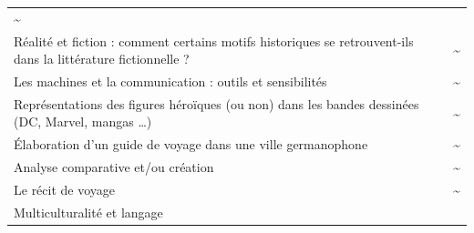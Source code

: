 \documentclass[
  10pt,
  french,
  a5paper,
  openany]{book}
\begin{document}
\begin{longtable}[]{@{}lc@{}}
\begin{minipage}[t]{0.06\columnwidth}
\textasciitilde{}\strut
\end{minipage}\tabularnewline
\begin{minipage}[t]{0.88\columnwidth}\raggedright
Réalité et fiction : comment certains motifs historiques se retrouvent-ils dans la littérature fictionnelle ?\strut
\end{minipage} & \begin{minipage}[t]{0.06\columnwidth}\centering
\textasciitilde{}\strut
\end{minipage}\tabularnewline
\begin{minipage}[t]{0.88\columnwidth}\raggedright
Les machines et la communication : outils et sensibilités\strut
\end{minipage} & \begin{minipage}[t]{0.06\columnwidth}\centering
\textasciitilde{}\strut
\end{minipage}\tabularnewline
\begin{minipage}[t]{0.88\columnwidth}\raggedright
Représentations des figures héroïques (ou non) dans les bandes dessinées (DC, Marvel, mangas \ldots)\strut
\end{minipage} & \begin{minipage}[t]{0.06\columnwidth}\centering
\textasciitilde{}\strut
\end{minipage}\tabularnewline
\begin{minipage}[t]{0.88\columnwidth}\raggedright
Élaboration d'un guide de voyage dans une ville germanophone\strut
\end{minipage} & \begin{minipage}[t]{0.06\columnwidth}\centering
\textasciitilde{}\strut
\end{minipage}\tabularnewline
\begin{minipage}[t]{0.88\columnwidth}\raggedright
Analyse comparative et/ou création\strut
\end{minipage} & \begin{minipage}[t]{0.06\columnwidth}\centering
\textasciitilde{}\strut
\end{minipage}\tabularnewline
\begin{minipage}[t]{0.88\columnwidth}\raggedright
Le récit de voyage\strut
\end{minipage} & \begin{minipage}[t]{0.06\columnwidth}\centering
\textasciitilde{}\strut
\end{minipage}\tabularnewline
\begin{minipage}[t]{0.88\columnwidth}\raggedright
Multiculturalité et langage\strut

\end{minipage}
\end{longtable}
\end{document}
